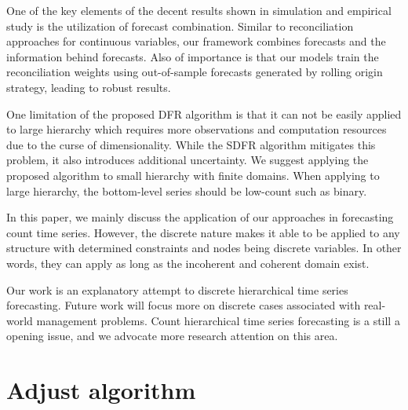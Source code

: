 \documentclass[a4paper,review,12pt,authoryear]{elsarticle}
\begin{document}
One of the key elements of the decent results shown in simulation and empirical study is the utilization of forecast combination.
Similar to reconciliation approaches for continuous variables, our framework combines forecasts and the information behind forecasts.
Also of importance is that our models train the reconciliation weights using out-of-sample forecasts generated by rolling origin strategy, leading to robust results. 

One limitation of the proposed DFR algorithm is that it can not be easily applied to large hierarchy which requires more observations and computation resources due to the curse of dimensionality.
While the SDFR algorithm mitigates this problem, it also introduces additional uncertainty. 
We suggest applying the proposed algorithm to small hierarchy with finite domains. 
When applying to large hierarchy, the bottom-level series should be low-count such as binary.

In this paper, we mainly discuss the application of our approaches in forecasting count time series. 
However, the discrete nature makes it able to be applied to any structure with determined constraints and nodes being discrete variables.
In other words, they can apply as long as the incoherent and coherent domain exist. 

Our work is an explanatory attempt to discrete hierarchical time series forecasting. 
Future work will focus more on discrete cases associated with real-world management problems.
Count hierarchical time series forecasting is a still a opening issue,
and we advocate more research attention on this area.


\newpage

\appendix
\section{Adjust algorithm}
\label{appendix:adjust}


\newpage



\end{document}

